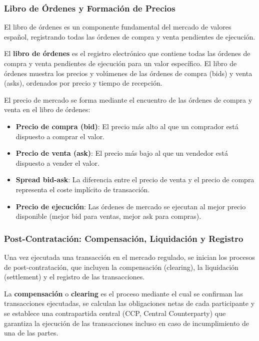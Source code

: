 \subsubsection{Libro de Órdenes y Formación de Precios}

El libro de órdenes es un componente fundamental del mercado de valores español, registrando todas las órdenes de compra y venta pendientes de ejecución.

\begin{definicion}
El \textbf{libro de órdenes} es el registro electrónico que contiene todas las órdenes de compra y venta pendientes de ejecución para un valor específico. El libro de órdenes muestra los precios y volúmenes de las órdenes de compra (bids) y venta (asks), ordenados por precio y tiempo de recepción.
\end{definicion}

\begin{proposicion}
El precio de mercado se forma mediante el encuentro de las órdenes de compra y venta en el libro de órdenes:
\begin{itemize}
\item \textbf{Precio de compra (bid)}: El precio más alto al que un comprador está dispuesto a comprar el valor.
\item \textbf{Precio de venta (ask)}: El precio más bajo al que un vendedor está dispuesto a vender el valor.
\item \textbf{Spread bid-ask}: La diferencia entre el precio de venta y el precio de compra representa el coste implícito de transacción.
\item \textbf{Precio de ejecución}: Las órdenes de mercado se ejecutan al mejor precio disponible (mejor bid para ventas, mejor ask para compras).
\end{itemize}
\end{proposicion}

\subsubsection{Post-Contratación: Compensación, Liquidación y Registro}

Una vez ejecutada una transacción en el mercado regulado, se inician los procesos de post-contratación, que incluyen la compensación (clearing), la liquidación (settlement) y el registro de las transacciones.

\begin{definicion}
La \textbf{compensación} o \textbf{clearing} es el proceso mediante el cual se confirman las transacciones ejecutadas, se calculan las obligaciones netas de cada participante y se establece una contrapartida central (CCP, Central Counterparty) que garantiza la ejecución de las transacciones incluso en caso de incumplimiento de una de las partes.
\end{definicion}

